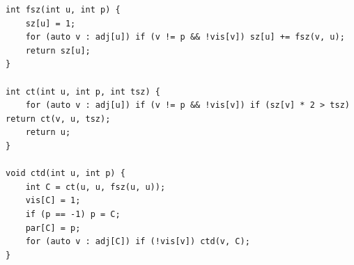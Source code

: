\begin{lstlisting}
int fsz(int u, int p) {
    sz[u] = 1;
    for (auto v : adj[u]) if (v != p && !vis[v]) sz[u] += fsz(v, u);
    return sz[u];
}
 
int ct(int u, int p, int tsz) {
    for (auto v : adj[u]) if (v != p && !vis[v]) if (sz[v] * 2 > tsz) return ct(v, u, tsz);
    return u;
}
 
void ctd(int u, int p) {
    int C = ct(u, u, fsz(u, u));
    vis[C] = 1;
    if (p == -1) p = C;
    par[C] = p;
    for (auto v : adj[C]) if (!vis[v]) ctd(v, C);
}
\end{lstlisting}

\break
